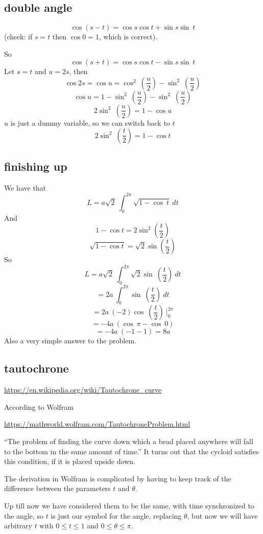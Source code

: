 \documentclass[11pt, oneside]{article}
\begin{document}
\subsection*{double angle}

\[ \cos (s-t) = \cos s \cos t + \sin s \sin \ t \]
(check:  if $s=t$ then $\cos 0 = 1$, which is correct).

So
\[ \cos (s+t) = \cos s \cos t - \sin s \sin \ t \]
Let $s = t$ and $u = 2s$, then
\[ \cos 2s = \cos u = \cos^2 \ (\frac{u}{2}) - \sin^2 \ (\frac{u}{2}) \]
\[ \cos u = 1 - \sin^2 \ (\frac{u}{2}) - \sin^2 \ (\frac{u}{2}) \]
\[ 2 \sin^2 \ (\frac{u}{2}) = 1 - \cos u \]
$u$ is just a dummy variable, so we can switch back to $t$
\[ 2 \sin^2 \ (\frac{t}{2}) = 1 - \cos t \]

\subsection*{finishing up}
We have that 
\[ L = a \sqrt{2} \ \int_0^{2\pi} \sqrt{1 - \cos \ t} \ dt\]
And
\[ 1 - \cos t = 2 \sin^2(\frac{t}{2}) \]
\[ \sqrt{1 - \cos t} = \sqrt{2} \sin(\frac{t}{2}) \]
So
\[ L = a \sqrt{2} \ \int_0^{2\pi} \sqrt{2} \sin \ (\frac{t}{2}) \ dt\]
\[  = 2a  \ \int_0^{2\pi} \sin \ (\frac{t}{2}) \ dt\]
\[ = 2a \ (-2) \cos \ (\frac{t}{2})\ \bigg |_0^{2\pi} \]
\[ = -4a \ (\cos \ \pi - \cos \ 0) \]
\[ = -4a \ (-1 - 1) = 8a\]
Also a very simple answer to the problem.

\subsection*{tautochrone}

\url{https://en.wikipedia.org/wiki/Tautochrone_curve}

According to Wolfram

\url{https://mathworld.wolfram.com/TautochroneProblem.html}

``The problem of finding the curve down which a bead placed anywhere will fall to the bottom in the same amount of time.''  It turns out that the cycloid satisfies this condition, if it is placed upside down.

The derivation in Wolfram is complicated by having to keep track of the difference between the parameters $t$ and $\theta$.  

Up till now we have considered them to be the same, with time synchronized to the angle, so $t$ is just our symbol for the angle, replacing $\theta$, but now we will have arbitrary $t$ with $0 \le t \le 1$ and $0 \le \theta \le \pi$.
\end{document}
